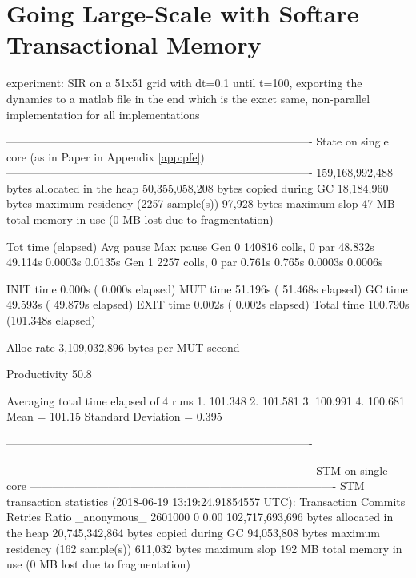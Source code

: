 \chapter{Going Large-Scale with Softare Transactional Memory}

experiment: SIR on a 51x51 grid with dt=0.1 until t=100, exporting the dynamics to a matlab file in the end which is the exact same, non-parallel implementation for all implementations 

----------------------------------------------------------------------------------
State on single core (as in Paper in Appendix \ref{app:pfe})
----------------------------------------------------------------------------------
 159,168,992,488 bytes allocated in the heap
  50,355,058,208 bytes copied during GC
      18,184,960 bytes maximum residency (2257 sample(s))
          97,928 bytes maximum slop
              47 MB total memory in use (0 MB lost due to fragmentation)

                                     Tot time (elapsed)  Avg pause  Max pause
  Gen  0     140816 colls,     0 par   48.832s  49.114s     0.0003s    0.0135s
  Gen  1      2257 colls,     0 par    0.761s   0.765s     0.0003s    0.0006s

  INIT    time    0.000s  (  0.000s elapsed)
  MUT     time   51.196s  ( 51.468s elapsed)
  GC      time   49.593s  ( 49.879s elapsed)
  EXIT    time    0.002s  (  0.002s elapsed)
  Total   time  100.790s  (101.348s elapsed)


  Alloc rate    3,109,032,896 bytes per MUT second

  Productivity  50.8%
  
Averaging total time elapsed of 4 runs 
1. 101.348
2. 101.581
3. 100.991
4. 100.681
Mean = 101.15
Standard Deviation = 0.395

----------------------------------------------------------------------------------

----------------------------------------------------------------------------------
STM on single core
----------------------------------------------------------------------------------
STM transaction statistics (2018-06-19 13:19:24.91854557 UTC):
Transaction     Commits    Retries      Ratio
_anonymous_     2601000          0       0.00
 102,717,693,696 bytes allocated in the heap
  20,745,342,864 bytes copied during GC
      94,053,808 bytes maximum residency (162 sample(s))
         611,032 bytes maximum slop
             192 MB total memory in use (0 MB lost due to fragmentation)

